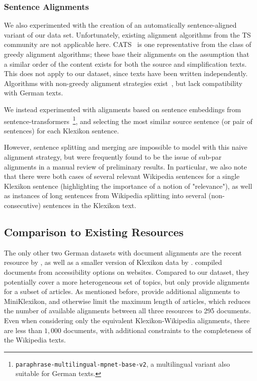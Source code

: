 \documentclass[10pt, a4paper]{article}
\begin{document}
\subsubsection{Sentence Alignments}
We also experimented with the creation of an automatically sentence-aligned variant of our data set.
Unfortunately, existing alignment algorithms from the TS community are not applicable here. CATS~\cite{stajner-etal-2018-cats} is one representative from the class of greedy alignment algorithms; these base their alignments on the assumption that a similar order of the content exists for both the source and simplification texts. This does not apply to our dataset, since texts have been written independently.
Algorithms with non-greedy alignment strategies exist~\cite{paetzold-etal-2017-massalign,jiang-etal-2020-neural}, but lack compatibility with German texts.

We instead experimented with alignments based on sentence embeddings from sentence-transformers~\cite{reimers-gurevych-2019-sentence}\footnote{\texttt{paraphrase-multilingual-mpnet-base-v2}, a multilingual variant also suitable for German texts.}, and selecting the most similar source sentence (or pair of sentences) for each Klexikon sentence.

However, sentence splitting and merging are impossible to model with this naive alignment strategy, but were frequently found to be the issue of sub-par alignments in a manual review of preliminary results. In particular, we also note that there were both cases of several relevant Wikipedia sentences for a single Klexikon sentence (highlighting the importance of a notion of "relevance"), as well as instances of long sentences from Wikipedia splitting into several (non-consecutive) sentences in the Klexikon text.





\subsection{Comparison to Existing Resources}
The only other two German datasets with document alignments are the recent resource by \cite{battisti-etal-2020-corpus}, as well as a smaller version of Klexikon data by \cite{hewett-stede-2021-automatically}. \cite{battisti-etal-2020-corpus} compiled documents from accessibility options on websites. Compared to our dataset, they potentially cover a more heterogeneous set of topics, but only provide alignments for a subset of articles.
As mentioned before, \cite{hewett-stede-2021-automatically} provide additional alignments to MiniKlexikon, and otherwise limit the maximum length of articles, which reduces the number of available alignments between all three resources to 295 documents. Even when considering only the equivalent Klexikon-Wikipedia alignments, there are less than $1{,}000$ documents, with additional constraints to the completeness of the Wikipedia texts.
\end{document}
